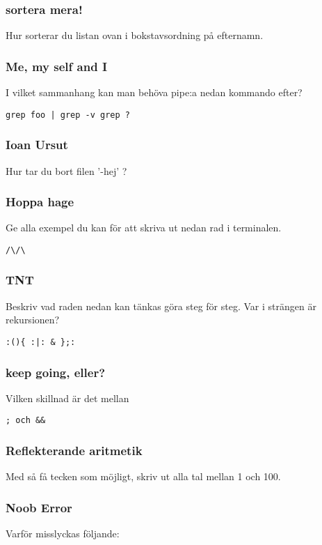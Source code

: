 \documentclass[a4paper]{report}
\begin{document}
\subsubsection{sortera mera!}
Hur sorterar du listan ovan i bokstavsordning på efternamn.

\subsubsection{Me, my self and I}
I vilket sammanhang kan man behöva pipe:a nedan kommando efter?
\begin{verbatim}
grep foo | grep -v grep ?
\end{verbatim}

\subsubsection{Ioan Ursut}
Hur tar du bort filen '-hej' ?

\subsubsection{Hoppa hage}
Ge alla exempel du kan för att skriva ut nedan rad i terminalen.
\begin{verbatim}
/\/\
\end{verbatim}

\subsubsection{TNT}
Beskriv vad raden nedan kan tänkas göra steg för steg. Var i strängen är rekursionen?

\begin{verbatim}
:(){ :|: & };:
\end{verbatim}

\subsubsection{keep going, eller?}
Vilken skillnad är det mellan
\begin{verbatim}
; och &&
\end{verbatim}

\subsubsection{Reflekterande aritmetik}
Med så få tecken som möjligt, skriv ut alla tal mellan 1 och 100.

\subsubsection{Noob Error}
Varför misslyckas följande:
\end{document}
